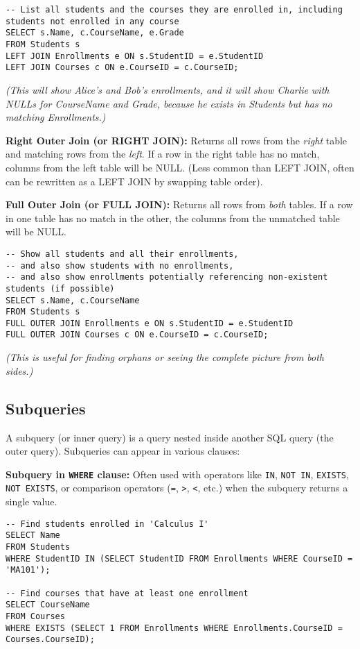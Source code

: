\documentclass[12pt]{book}
\begin{document}
\begin{lstlisting}[caption={Left Outer Join Example}, label=lst:left_join]
-- List all students and the courses they are enrolled in, including students not enrolled in any course
SELECT s.Name, c.CourseName, e.Grade
FROM Students s
LEFT JOIN Enrollments e ON s.StudentID = e.StudentID
LEFT JOIN Courses c ON e.CourseID = c.CourseID;
\end{lstlisting}
\textit{(This will show Alice's and Bob's enrollments, \emph{and} it will show Charlie with NULLs for CourseName and Grade, because he exists in Students but has no matching Enrollments.)}

\textbf{Right Outer Join (or RIGHT JOIN):}
Returns all rows from the \emph{right} table and matching rows from the \emph{left}. If a row in the right table has no match, columns from the left table will be NULL. (Less common than LEFT JOIN, often can be rewritten as a LEFT JOIN by swapping table order).

\textbf{Full Outer Join (or FULL JOIN):}
Returns all rows from \emph{both} tables. If a row in one table has no match in the other, the columns from the unmatched table will be NULL.

\begin{lstlisting}[caption={Full Outer Join Example}, label=lst:full_join]
-- Show all students and all their enrollments,
-- and also show students with no enrollments,
-- and also show enrollments potentially referencing non-existent students (if possible)
SELECT s.Name, c.CourseName
FROM Students s
FULL OUTER JOIN Enrollments e ON s.StudentID = e.StudentID
FULL OUTER JOIN Courses c ON e.CourseID = c.CourseID;
\end{lstlisting}
\textit{(This is useful for finding orphans or seeing the complete picture from both sides.)}

\subsection{Subqueries}

A subquery (or inner query) is a query nested inside another SQL query (the outer query). Subqueries can appear in various clauses:

\textbf{Subquery in \texttt{WHERE} clause:} Often used with operators like \texttt{IN}, \texttt{NOT IN}, \texttt{EXISTS}, \texttt{NOT EXISTS}, or comparison operators (\texttt{=}, \texttt{>}, \texttt{<}, etc.) when the subquery returns a single value.

\begin{lstlisting}[caption={Subquery in WHERE Clause}, label=lst:subquery_where]
-- Find students enrolled in 'Calculus I'
SELECT Name
FROM Students
WHERE StudentID IN (SELECT StudentID FROM Enrollments WHERE CourseID = 'MA101');

-- Find courses that have at least one enrollment
SELECT CourseName
FROM Courses
WHERE EXISTS (SELECT 1 FROM Enrollments WHERE Enrollments.CourseID = Courses.CourseID);
\end{lstlisting}
\end{document}
